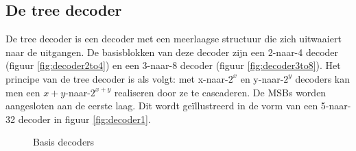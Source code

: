 \subsection{De tree decoder}
De tree decoder is een decoder met een meerlaagse structuur die zich uitwaaiert naar de uitgangen. De basisblokken van deze decoder zijn een 2-naar-4 decoder (figuur \ref{fig:decoder2to4}) en een 3-naar-8 decoder (figuur \ref{fig:decoder3to8}). Het principe van de tree decoder is als volgt: met x-naar-$2^x$ en y-naar-$2^y$ decoders kan men een $x+y$-naar-$2^{x+y}$ realiseren door ze te cascaderen. De MSBs worden aangesloten aan de eerste laag. Dit wordt geïllustreerd in de vorm van een 5-naar-32 decoder in figuur \ref{fig:decoder1}. 
\begin{figure}[!ht]
\centering
{}
\caption[Basis decoders]{Basis decoders}
\end{figure}

